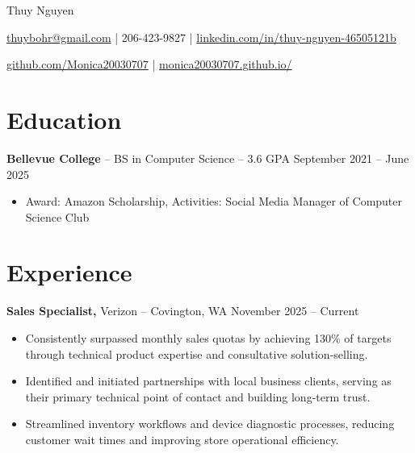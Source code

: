 \documentclass[11pt]{article}       %
\begin{document}
\centerline{\Huge Thuy Nguyen}

\vspace{5pt}

\centerline{\href{mailto:thuybohr@gmail.com}{thuybohr@gmail.com} | 206-423-9827 |
\href{https://www.linkedin.com/in/thuy-nguyen-46505121b/}{linkedin.com/in/thuy-nguyen-46505121b}}

\centerline{\href{https://github.com/Monica20030707}{github.com/Monica20030707} | 
\href{https://monica20030707.github.io/}{monica20030707.github.io/}} 

\vspace{-9pt}

\section*{Education}
\textbf{Bellevue College} -- BS in Computer Science -- 3.6 GPA \hfill September 2021 -- June 2025\\
\vspace{-9pt}
\begin{itemize}
  \item Award: Amazon Scholarship, Activities: Social Media Manager of Computer Science Club
\end{itemize}

\vspace{-18.5pt}

\section*{Experience}

\textbf{Sales Specialist,} {Verizon} -- Covington, WA \hfill November 2025 -- Current \\
\vspace{-9pt}
\begin{itemize}
  \item Consistently surpassed monthly sales quotas by achieving 130\% of targets through technical product expertise and consultative solution-selling.
  \item Identified and initiated partnerships with local business clients, serving as their primary technical point of contact and building long-term trust.
  \item Streamlined inventory workflows and device diagnostic processes, reducing customer wait times and improving store operational efficiency.
\end{itemize}
\end{document}
